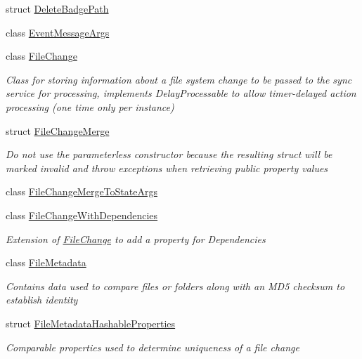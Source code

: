 \begin{DoxyCompactItemize}
struct \hyperlink{struct_cloud_api_public_1_1_model_1_1_delete_badge_path}{Delete\-Badge\-Path}
\item 
class \hyperlink{class_cloud_api_public_1_1_model_1_1_event_message_args}{Event\-Message\-Args}
\item 
class \hyperlink{class_cloud_api_public_1_1_model_1_1_file_change}{File\-Change}
\begin{DoxyCompactList}\small\item\em Class for storing information about a file system change to be passed to the sync service for processing, implements Delay\-Processable to allow timer-\/delayed action processing (one time only per instance) \end{DoxyCompactList}\item 
struct \hyperlink{struct_cloud_api_public_1_1_model_1_1_file_change_merge}{File\-Change\-Merge}
\begin{DoxyCompactList}\small\item\em Do not use the parameterless constructor because the resulting struct will be marked invalid and throw exceptions when retrieving public property values \end{DoxyCompactList}\item 
class \hyperlink{class_cloud_api_public_1_1_model_1_1_file_change_merge_to_state_args}{File\-Change\-Merge\-To\-State\-Args}
\item 
class \hyperlink{class_cloud_api_public_1_1_model_1_1_file_change_with_dependencies}{File\-Change\-With\-Dependencies}
\begin{DoxyCompactList}\small\item\em Extension of \hyperlink{class_cloud_api_public_1_1_model_1_1_file_change}{File\-Change} to add a property for Dependencies \end{DoxyCompactList}\item 
class \hyperlink{class_cloud_api_public_1_1_model_1_1_file_metadata}{File\-Metadata}
\begin{DoxyCompactList}\small\item\em Contains data used to compare files or folders along with an M\-D5 checksum to establish identity \end{DoxyCompactList}\item 
struct \hyperlink{struct_cloud_api_public_1_1_model_1_1_file_metadata_hashable_properties}{File\-Metadata\-Hashable\-Properties}
\begin{DoxyCompactList}\small\item\em Comparable properties used to determine uniqueness of a file change \end{DoxyCompactList}\item 

\end{DoxyCompactItemize}
